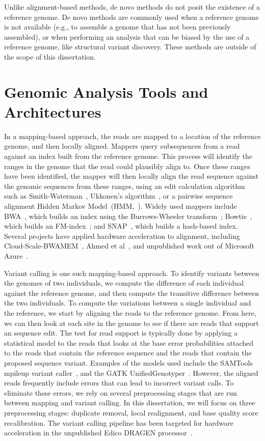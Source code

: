 \documentclass[phd]{ucbthesis}
\begin{document}
Unlike alignment-based methods, de novo methods do not posit the existence of a
reference genome. De novo methods are commonly used when a reference genome is
not available (e.g., to assemble a genome that has not been previously
assembled), or when performing an analysis that can be biased by the use of a
reference genome, like structural variant discovery. These methods are outside
of the scope of this dissertation.

\section{Genomic Analysis Tools and Architectures}
\label{sec:genomic-analysis}

In a mapping-based approach, the reads are mapped to a location of the reference
genome, and then locally aligned. Mappers query subsequences from a read against
an index built from the reference genome. This process will identify the ranges
in the genome that the read could plausibly align to. Once these ranges have
been identified, the mapper will then locally align the read sequence against
the genomic sequences from these ranges, using an edit calculation algorithm such
as Smith-Waterman~\cite{smith81}, Ukkonen's algorithm~\cite{ukkonen85}, or a
pairwise sequence alignment Hidden Markov Model~(HMM,~\cite{durbin98}). Widely
used mappers include {BWA}~\cite{li09}, which builds an index using the
Burrows-Wheeler transform~\cite{burrows94}; {Bowtie}~\cite{langmead09bowtie},
which builds an FM-index~\cite{ferragina00}; and {SNAP}~\cite{zaharia11},
which builds a hash-based index. Several projects have applied hardware acceleration
to alignment, including {Cloud-Scale-BWAMEM}~\cite{chen16, chen15}, Ahmed
et al~\cite{ahmed15}, and unpublished work out of Microsoft
Azure~\cite{msr16}.

Variant calling is one such mapping-based approach. To identify variants between
the genomes of two individuals, we compute the difference of each individual
against the reference genome, and then compute the transitive difference between
the two individuals. To compute the variations between a single individual and
the reference, we start by aligning the reads to the reference genome. From
here, we can then look at each site in the genome to see if there are reads that
support an sequence edit. The test for read support is typically done by applying a statistical model
to the reads that looks at the base error probabilities attached to the reads
that contain the reference sequence and the reads that contain the proposed
sequence variant. Examples of the models used include the {SAMTools
mpileup} variant caller~\cite{li11}, and the {GATK
UnifiedGenotyper}~\cite{depristo11}. However, the aligned reads frequently
include errors that can lead to incorrect variant calls. To eliminate these
errors, we rely on several preprocessing stages that are run between mapping and
variant calling. In this dissertation, we will focus on three preprocessing stages:
duplicate removal, local realignment, and base quality score recalibration.
The variant calling pipeline has been targeted for hardware acceleration in the
unpublished Edico {DRAGEN} processor~\cite{dragen}.
\end{document}
